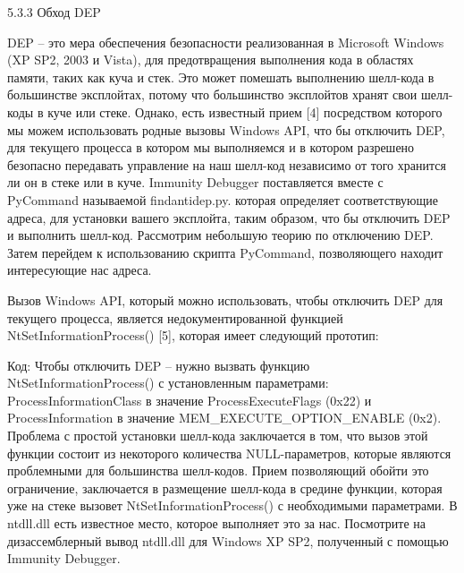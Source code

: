 \documentclass[12pt, a4paper, oneside]{book}
\begin{document}
5.3.3 Обход DEP

DEP – это мера обеспечения безопасности реализованная в Microsoft Windows (XP SP2, 2003 и Vista), для предотвращения выполнения кода в областях памяти, таких как куча и стек. Это может помешать выполнению шелл-кода в большинстве эксплойтах, потому что большинство эксплойтов хранят свои шелл-коды в куче или стеке. Однако, есть известный прием [4] посредством которого мы можем использовать родные вызовы Windows API, что бы отключить DEP, для текущего процесса в котором мы выполняемся и в котором разрешено безопасно передавать управление на наш шелл-код независимо от того хранится ли он в стеке или в куче. Immunity Debugger поставляется вместе с PyCommand называемой findantidep.py. которая определяет соответствующие адреса, для установки вашего эксплойта, таким образом, что бы отключить DEP и выполнить шелл-код. Рассмотрим небольшую теорию по отключению DEP. Затем перейдем к использованию скрипта PyCommand, позволяющего находит интересующие нас адреса. 

Вызов Windows API, который можно использовать, чтобы отключить DEP для текущего процесса, является недокументированной функцией NtSetInformationProcess() [5], которая имеет следующий прототип:

Код:
Чтобы отключить DEP – нужно вызвать функцию NtSetInformationProcess() с установленным параметрами: ProcessInformationClass в значение ProcessExecuteFlags (0x22) и ProcessInformation в значение MEM\_EXECUTE\_OPTION\_ENABLE (0x2). Проблема с простой установки шелл-кода заключается в том, что вызов этой функции состоит из некоторого количества NULL-параметров, которые являются проблемными для большинства шелл-кодов. Прием позволяющий обойти это ограничение, заключается в размещение шелл-кода в средине функции, которая уже на стеке вызовет NtSetInformationProcess() с необходимыми параметрами. В ntdll.dll есть известное место, которое выполняет это за нас. Посмотрите на дизассемблерный вывод ntdll.dll для Windows XP SP2, полученный с помощью Immunity Debugger.
\end{document}
